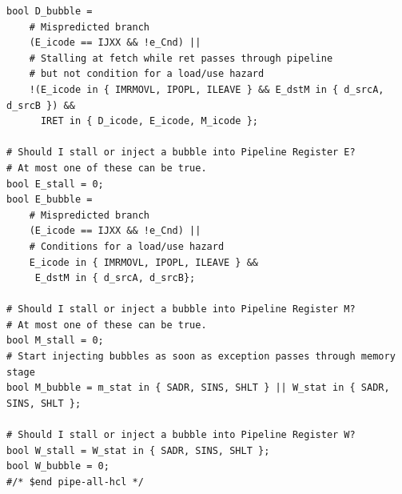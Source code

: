 \documentclass{article}
\begin{document}
\begin{itemize}
\begin{lstlisting}[caption={}]
bool D_bubble =
	# Mispredicted branch
	(E_icode == IJXX && !e_Cnd) ||
	# Stalling at fetch while ret passes through pipeline
	# but not condition for a load/use hazard
	!(E_icode in { IMRMOVL, IPOPL, ILEAVE } && E_dstM in { d_srcA, d_srcB }) &&
	  IRET in { D_icode, E_icode, M_icode };

# Should I stall or inject a bubble into Pipeline Register E?
# At most one of these can be true.
bool E_stall = 0;
bool E_bubble =
	# Mispredicted branch
	(E_icode == IJXX && !e_Cnd) ||
	# Conditions for a load/use hazard
	E_icode in { IMRMOVL, IPOPL, ILEAVE } &&
	 E_dstM in { d_srcA, d_srcB};

# Should I stall or inject a bubble into Pipeline Register M?
# At most one of these can be true.
bool M_stall = 0;
# Start injecting bubbles as soon as exception passes through memory stage
bool M_bubble = m_stat in { SADR, SINS, SHLT } || W_stat in { SADR, SINS, SHLT };

# Should I stall or inject a bubble into Pipeline Register W?
bool W_stall = W_stat in { SADR, SINS, SHLT };
bool W_bubble = 0;
#/* $end pipe-all-hcl */
   \end{lstlisting}

\end{itemize}
\end{document}
